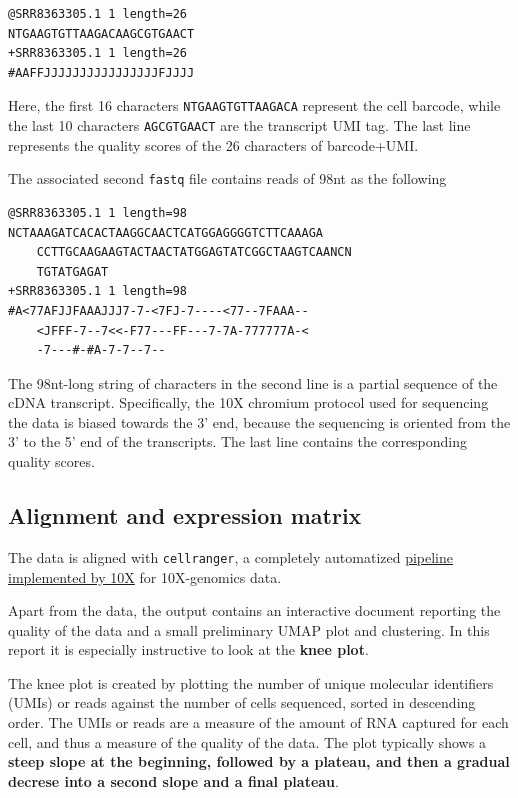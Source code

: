 \documentclass[
  letterpaper,
  DIV=11,
  numbers=noendperiod]{scrartcl}
\begin{document}
\begin{verbatim}
@SRR8363305.1 1 length=26
NTGAAGTGTTAAGACAAGCGTGAACT
+SRR8363305.1 1 length=26
#AAFFJJJJJJJJJJJJJJJJFJJJJ
\end{verbatim}

Here, the first 16 characters \texttt{NTGAAGTGTTAAGACA} represent the
cell barcode, while the last 10 characters \texttt{AGCGTGAACT} are the
transcript UMI tag. The last line represents the quality scores of the
26 characters of barcode+UMI.

The associated second \texttt{fastq} file contains reads of 98nt as the
following

\begin{verbatim}
@SRR8363305.1 1 length=98
NCTAAAGATCACACTAAGGCAACTCATGGAGGGGTCTTCAAAGA
    CCTTGCAAGAAGTACTAACTATGGAGTATCGGCTAAGTCAANCN
    TGTATGAGAT
+SRR8363305.1 1 length=98
#A<77AFJJFAAAJJJ7-7-<7FJ-7----<77--7FAAA--
    <JFFF-7--7<<-F77---FF---7-7A-777777A-<
    -7---#-#A-7-7--7--
\end{verbatim}

The 98nt-long string of characters in the second line is a partial
sequence of the cDNA transcript. Specifically, the 10X chromium protocol
used for sequencing the data is biased towards the 3' end, because the
sequencing is oriented from the 3' to the 5' end of the transcripts. The
last line contains the corresponding quality scores.

\subsection{Alignment and expression
matrix}\label{alignment-and-expression-matrix}

The data is aligned with \texttt{cellranger}, a completely automatized
\href{https://support.10xgenomics.com/single-cell-gene-expression/software/pipelines/latest/what-is-cell-ranger}{pipeline
implemented by 10X} for 10X-genomics data.

Apart from the data, the output contains an interactive document
reporting the quality of the data and a small preliminary UMAP plot and
clustering. In this report it is especially instructive to look at the
\textbf{knee plot}.

The knee plot is created by plotting the number of unique molecular
identifiers (UMIs) or reads against the number of cells sequenced,
sorted in descending order. The UMIs or reads are a measure of the
amount of RNA captured for each cell, and thus a measure of the quality
of the data. The plot typically shows a \textbf{steep slope at the
beginning, followed by a plateau, and then a gradual decrese into a
second slope and a final plateau}.
\end{document}
